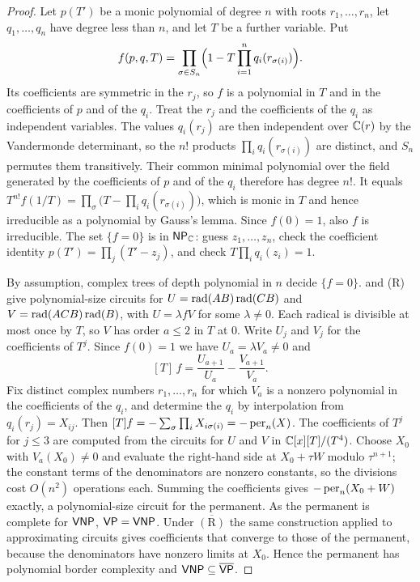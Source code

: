 \begin{proof}
Let $p(T')$ be a monic polynomial of degree $n$ with roots $r_1,\dots,r_n$, let $q_1,\dots,q_n$ have degree less than $n$, and let $T$ be a further variable. Put
\[
f(p,q,T)=\prod_{\sigma\in S_n}\Bigl(1-T\prod_{i=1}^nq_i(r_{\sigma(i)})\Bigr).
\]
Its coefficients are symmetric in the $r_j$, so $f$ is a polynomial in $T$ and in the coefficients of $p$ and of the $q_i$. Treat the $r_j$ and the coefficients of the $q_i$ as independent variables. The values $q_i(r_j)$ are then independent over $\mathbb{C}(r)$ by the Vandermonde determinant, so the $n!$ products $\prod_iq_i(r_{\sigma(i)})$ are distinct, and $S_n$ permutes them transitively. Their common minimal polynomial over the field generated by the coefficients of $p$ and of the $q_i$ therefore has degree $n!$. It equals $T^{n!}f(1/T)=\prod_\sigma\bigl(T-\prod_iq_i(r_{\sigma(i)})\bigr)$, which is monic in $T$ and hence irreducible as a polynomial by Gauss's lemma. Since $f(0)=1$, also $f$ is irreducible. The set $\{f=0\}$ is in $\textsf{\upshape NP}_{\mathbb{C}}$: guess $z_1,\dots,z_n$, check the coefficient identity $p(T')=\prod_j(T'-z_j)$, and check $T\prod_iq_i(z_i)=1$.

By assumption, complex trees of depth polynomial in $n$ decide $\{f=0\}$.  and \textup{(R)} give polynomial-size circuits for $U=\operatorname{rad}(AB)\operatorname{rad}(CB)$ and $V=\operatorname{rad}(ACB)\operatorname{rad}(B)$, with $U=\lambda fV$ for some $\lambda\ne0$. Each radical is divisible at most once by $T$, so $V$ has order $a\le2$ in $T$ at $0$. Write $U_j$ and $V_j$ for the coefficients of $T^j$. Since $f(0)=1$ we have $U_a=\lambda V_a\ne0$ and
\[
[T]\,f=\frac{U_{a+1}}{U_a}-\frac{V_{a+1}}{V_a}.
\]
Fix distinct complex numbers $r_1,\dots,r_n$ for which $V_a$ is a nonzero polynomial in the coefficients of the $q_i$, and determine the $q_i$ by interpolation from $q_i(r_j)=X_{ij}$. Then $[T]f=-\sum_\sigma\prod_iX_{i\sigma(i)}=-\operatorname{per}_n(X)$. The coefficients of $T^j$ for $j\le3$ are computed from the circuits for $U$ and $V$ in $\mathbb{C}[x][T]/(T^4)$. Choose $X_0$ with $V_a(X_0)\ne0$ and evaluate the right-hand side at $X_0+\tau W$ modulo $\tau^{n+1}$; the constant terms of the denominators are nonzero constants, so the divisions cost $O(n^2)$ operations each. Summing the coefficients gives $-\operatorname{per}_n(X_0+W)$ exactly, a polynomial-size circuit for the permanent. As the permanent is complete for $\textsf{\upshape VNP}$, $\textsf{\upshape VP}=\textsf{\upshape VNP}$. Under $\overline{\mathrm{(R)}}$ the same construction applied to approximating circuits gives coefficients that converge to those of the permanent, because the denominators have nonzero limits at $X_0$. Hence the permanent has polynomial border complexity and $\textsf{\upshape VNP}\subseteq\overline{\textsf{\upshape VP}}$.
\end{proof}

